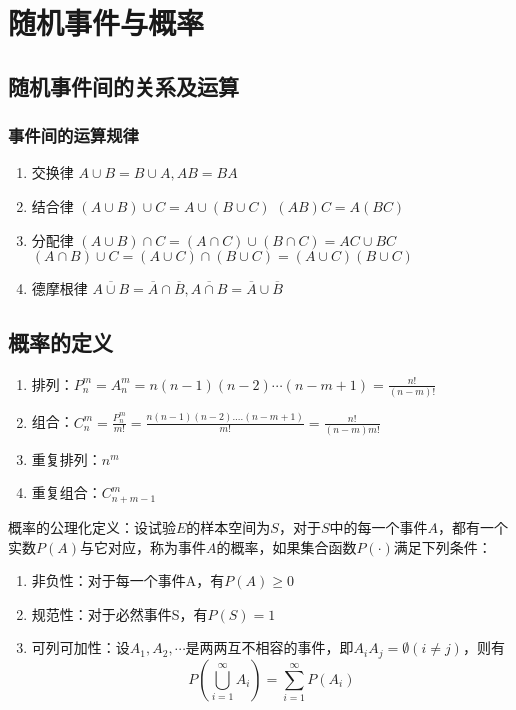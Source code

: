 \chapter{随机事件与概率}
\section{随机事件间的关系及运算}
\subsection{事件间的运算规律}
\begin{enumerate}
    \item 交换律 $A \cup B = B \cup A,AB = BA$
    \item 结合律 $(A \cup B) \cup C = A \cup (B \cup C)$ $(AB)C = A(BC)$
    \item 分配律 $(A \cup B) \cap C = (A \cap C) \cup (B \cap C) = AC \cup BC$
          $(A \cap B) \cup C = (A \cup C) \cap (B \cup C) = (A \cup C)(B \cup C)$
    \item 德摩根律 $\overline{A \cup B}  = \overline A  \cap \overline B ,\overline {A \cap B}  = \overline A  \cup \overline B $
\end{enumerate}
\section{概率的定义}
\begin{enumerate}
    \item 排列：$P_n^m= A_n^m=n(n-1)(n-2) \cdots (n-m+1)=\frac{n!}{(n-m)!}$
    \item 组合：$C_n^m = \frac{P_n^m}{m!} = \frac{n(n - 1)(n - 2)....(n - m + 1)}{m!} = \frac{n!}{(n - m)m!}$
    \item 重复排列：$n^m$
    \item 重复组合：$C_{n + m - 1}^m$
\end{enumerate}
概率的公理化定义：设试验$E$的样本空间为$S$，对于$S$中的每一个事件$A$，都有一个实数$P(A)$与它对应，称为事件$A$的概率，如果集合函数$P(·)$满足下列条件：
\begin{enumerate}
    \item 非负性：对于每一个事件A，有$P(A) \ge 0$
    \item 规范性：对于必然事件S，有$P(S) = 1$
    \item 可列可加性：设$A_1,A_2,\cdots$是两两互不相容的事件，即$A_iA_j = \emptyset (i \ne j)$，则有
          $$P\left( {\bigcup\limits_{i = 1}^\infty  {A_i} } \right) = \sum\limits_{i = 1}^\infty  {P(A_i)}
          $$
\end{enumerate}

